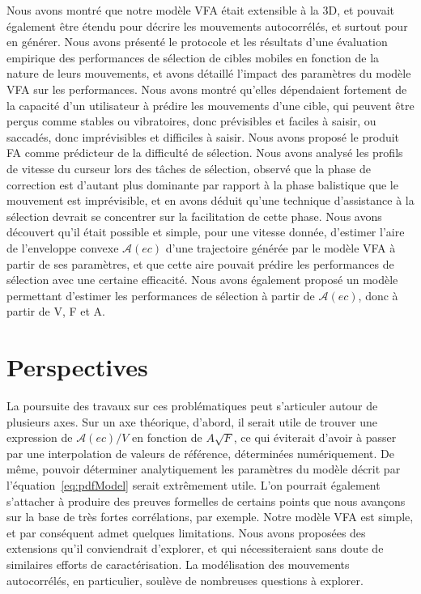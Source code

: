 	Nous avons montré que notre modèle VFA était extensible à la 3D, et pouvait également être étendu pour décrire les mouvements autocorrélés, et surtout pour en générer. Nous avons présenté le protocole et les résultats d'une évaluation empirique des performances de sélection de cibles mobiles en fonction de la nature de leurs mouvements, et avons détaillé l'impact des paramètres du modèle VFA sur les performances. Nous avons montré qu'elles dépendaient fortement de la capacité d'un utilisateur à prédire les mouvements d'une cible, qui peuvent être perçus comme stables ou vibratoires, donc prévisibles et faciles à saisir, ou saccadés, donc imprévisibles et difficiles à saisir. Nous avons proposé le produit FA comme prédicteur de la difficulté de sélection. Nous avons analysé les profils de vitesse du curseur lors des tâches de sélection, observé que la phase de correction est d'autant plus dominante par rapport à la phase balistique que le mouvement est imprévisible, et en avons déduit qu'une technique d'assistance à la sélection devrait se concentrer sur la facilitation de cette phase. Nous avons découvert qu'il était possible et simple, pour une vitesse donnée, d'estimer l'aire de l'enveloppe convexe $\mathcal{A}(ec)$ d'une trajectoire générée par le modèle VFA à partir de ses paramètres, et que cette aire pouvait prédire les performances de sélection avec une certaine efficacité. Nous avons également proposé un modèle permettant d'estimer les performances de sélection à partir de $\mathcal{A}(ec)$, donc à partir de V, F et A.
	
	\section*{Perspectives}
	La poursuite des travaux sur ces problématiques peut s'articuler autour de plusieurs axes. Sur un axe théorique, d'abord, il serait utile de trouver une expression de $\mathcal{A}(ec)/V$ en fonction de $A\sqrt{F}$, ce qui éviterait d'avoir à passer par une interpolation de valeurs de référence, déterminées numériquement. De même, pouvoir déterminer analytiquement les paramètres du modèle décrit par l'équation~\ref{eq:pdfModel} serait extrêmement utile. L'on pourrait également s'attacher à produire des preuves formelles de certains points que nous avançons sur la base de très fortes corrélations, par exemple. Notre modèle VFA est simple, et par conséquent admet quelques limitations. Nous avons proposées des extensions qu'il conviendrait d'explorer, et qui nécessiteraient sans doute de similaires efforts de caractérisation. La modélisation des mouvements autocorrélés, en particulier, soulève de nombreuses questions à explorer.
	
